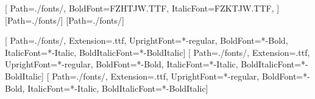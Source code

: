 

\usepackage{ctex}
\usepackage{syntonly} %
\usepackage{graphicx} %







[ %
    Path=./fonts/,
    BoldFont=FZHTJW.TTF, %
    ItalicFont=FZKTJW.TTF, %
]
[Path=./fonts/] %
[Path=./fonts/] %

\setmainfont{CaskaydiaCoveNerdFont}[ %
    Path=./fonts/, %
    Extension=.ttf, %
    UprightFont=*-regular, %
    BoldFont=*-Bold, %
    ItalicFont=*-Italic, %
    BoldItalicFont=*-BoldItalic]
\setsansfont{CaskaydiaCoveNerdFont}[ %
    Path=./fonts/, %
    Extension=.ttf, %
    UprightFont=*-regular, %
    BoldFont=*-Bold, %
    ItalicFont=*-Italic, %
    BoldItalicFont=*-BoldItalic]
\setmonofont{CaskaydiaCoveNerdFontMono}[ %
    Path=./fonts/, %
    Extension=.ttf, %
    UprightFont=*-regular, %
    BoldFont=*-Bold, %
    ItalicFont=*-Italic, %
    BoldItalicFont=*-BoldItalic]




